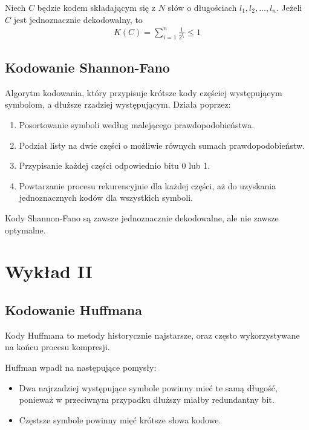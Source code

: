 \documentclass{article}
\numberwithin{equation}{subsection}
\newenvironment{definition}[1]{%
    \trivlist
    \item[\hskip\labelsep\textbf{Definition. #1.}]
    \ignorespaces
}{%
    \endtrivlist
}
\newenvironment{theorem}[1]{%
    \trivlist
    \item[\hskip\labelsep\textbf{Theorem. #1.}]
    \ignorespaces
}{%
    \endtrivlist
}
\newenvironment{information}[1]{%
    \trivlist
    \item[\hskip\labelsep\textbf{Information. #1.}]
    \ignorespaces
}{%
    \endtrivlist
}
\begin{document}
\begin{theorem}{Nierówność Krafta-McMillana}
    Niech $C$ będzie kodem składającym się z $N$ słów o długościach $l_1,l_2,\dots,l_n$. Jeżeli $C$ jest jednoznacznie dekodowalny, to
    \begin{align*}
        K(C) = \sum_{i=1}^{n} \frac{1}{2^{l_i}} \leq 1
    \end{align*}
\end{theorem}

\subsection{Kodowanie Shannon-Fano}

\begin{definition}{Kodowanie Shannon-Fano}
    Algorytm kodowania, który przypisuje krótsze kody częściej występującym symbolom, a dłuższe rzadziej występującym. Działa poprzez:
    \begin{enumerate}
        \item Posortowanie symboli według malejącego prawdopodobieństwa.
        \item Podział listy na dwie części o możliwie równych sumach prawdopodobieństw.
        \item Przypisanie każdej części odpowiednio bitu 0 lub 1.
        \item Powtarzanie procesu rekurencyjnie dla każdej części, aż do uzyskania jednoznacznych kodów dla wszystkich symboli.
    \end{enumerate}
    Kody Shannon-Fano są zawsze jednoznacznie dekodowalne, ale nie zawsze optymalne.
\end{definition}

\section{Wykład II}

\subsection{Kodowanie Huffmana}

Kody Huffmana to metody historycznie najstarsze, oraz często wykorzystywane na końcu procesu kompresji.

\begin{information}{Obserwacje Huffmana}
    Huffman wpadł na następujące pomysły:
    \begin{itemize}
        \item Dwa najrzadziej występujące symbole powinny mieć te samą długość,
        ponieważ w przeciwnym przypadku dłuższy miałby redundantny bit.
        \item Częstsze symbole powinny mięć krótsze słowa kodowe.
    \end{itemize}
\end{information}
\end{document}
